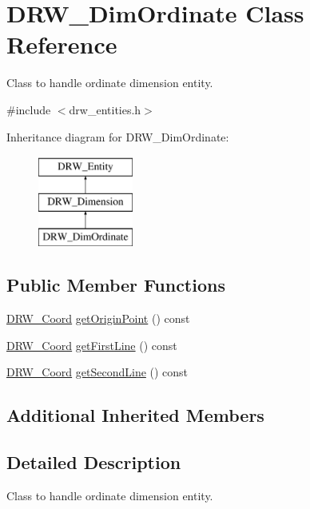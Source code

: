 \hypertarget{class_d_r_w___dim_ordinate}{}\section{D\+R\+W\+\_\+\+Dim\+Ordinate Class Reference}
\label{class_d_r_w___dim_ordinate}


Class to handle ordinate dimension entity.  




{\ttfamily \#include $<$drw\+\_\+entities.\+h$>$}

Inheritance diagram for D\+R\+W\+\_\+\+Dim\+Ordinate\+:\begin{figure}[H]
\begin{center}
\leavevmode
\includegraphics[height=3.000000cm]{d7/d1e/class_d_r_w___dim_ordinate}
\end{center}
\end{figure}
\subsection*{Public Member Functions}
\begin{DoxyCompactItemize}
\item 
\hyperlink{class_d_r_w___coord}{D\+R\+W\+\_\+\+Coord} \hyperlink{class_d_r_w___dim_ordinate_a8edf6d0926e228257425da4dc76b0b46}{get\+Origin\+Point} () const 
\item 
\hyperlink{class_d_r_w___coord}{D\+R\+W\+\_\+\+Coord} \hyperlink{class_d_r_w___dim_ordinate_a4effa3ec976e12b2cf7ade6caced2cfb}{get\+First\+Line} () const 
\item 
\hyperlink{class_d_r_w___coord}{D\+R\+W\+\_\+\+Coord} \hyperlink{class_d_r_w___dim_ordinate_afff3c4532e4d7bccf97867b96dc36491}{get\+Second\+Line} () const 
\end{DoxyCompactItemize}
\subsection*{Additional Inherited Members}


\subsection{Detailed Description}
Class to handle ordinate dimension entity. 

